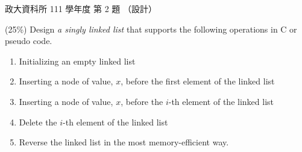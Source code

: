 \begin{pastexam}[label={px:nccu-111-dsa-02}]{政大資科所 111 學年度 第 2 題}
（設計）

(25\%) Design \textit{a singly linked list} that supports the following operations in C or pseudo code.
\begin{enumerate}[label=2.\arabic*]
\item Initializing an empty linked list
\item Inserting a node of value, $x$, before the first element of the linked list
\item Inserting a node of value, $x$, before the $i$-th element of the linked list
\item Delete the $i$-th element of the linked list
\item Reverse the linked list in the most memory-efficient way.
\end{enumerate}
\end{pastexam}

